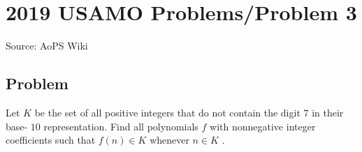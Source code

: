 \documentclass[12pt]{article}
\begin{document}
\section*{{2019 USAMO Problems/Problem 3}}
Source: AoPS Wiki

\subsection*{Problem}
Let $K$ be the set of all positive integers that do not contain the digit $7$ in their base- $10$ representation. Find all polynomials $f$ with nonnegative integer coefficients such that $f(n)\in K$ whenever $n\in K$ .
\end{document}
